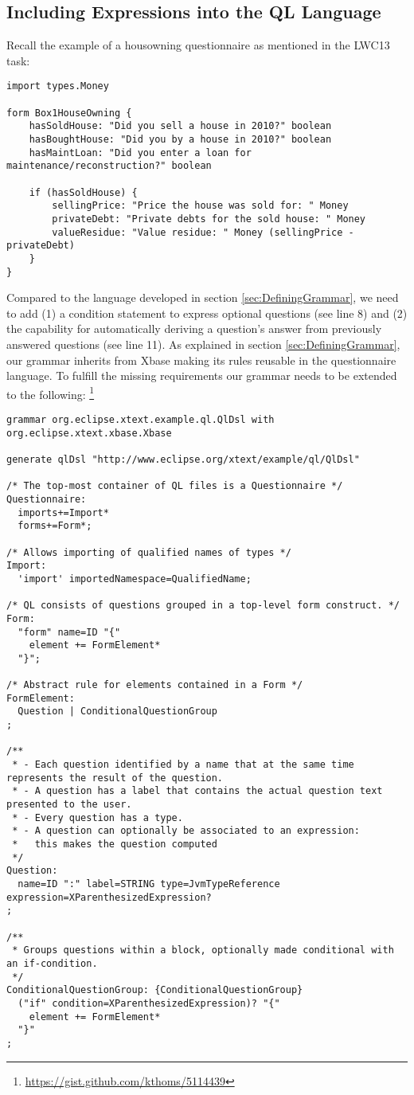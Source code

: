 \subsection{Including Expressions into the QL Language}

Recall the example of a housowning questionnaire as mentioned in the LWC13 task:

\begin{lstlisting}[language=QL]
import types.Money

form Box1HouseOwning {
	hasSoldHouse: "Did you sell a house in 2010?" boolean
	hasBoughtHouse: "Did you by a house in 2010?" boolean
	hasMaintLoan: "Did you enter a loan for maintenance/reconstruction?" boolean
	
	if (hasSoldHouse) {
		sellingPrice: "Price the house was sold for: " Money 
		privateDebt: "Private debts for the sold house: " Money
		valueResidue: "Value residue: " Money (sellingPrice - privateDebt) 
	}
}
\end{lstlisting}

Compared to the language developed in section \ref{sec:DefiningGrammar}, we need to add (1) a condition
statement to express optional questions (see line 8) and (2) the capability for automatically 
deriving a question's answer from previously answered questions (see line 11). As explained in section
\ref{sec:DefiningGrammar}, our grammar inherits from Xbase making its rules reusable in the 
questionnaire language. To fulfill the missing requirements our grammar needs to be extended to the following:
\footnote{\url{https://gist.github.com/kthoms/5114439}}

\begin{lstlisting}[language=Xtext]
grammar org.eclipse.xtext.example.ql.QlDsl with org.eclipse.xtext.xbase.Xbase

generate qlDsl "http://www.eclipse.org/xtext/example/ql/QlDsl"

/* The top-most container of QL files is a Questionnaire */
Questionnaire:
  imports+=Import*
  forms+=Form*;

/* Allows importing of qualified names of types */
Import:
  'import' importedNamespace=QualifiedName;

/* QL consists of questions grouped in a top-level form construct. */
Form:
  "form" name=ID "{"
    element += FormElement*
  "}";

/* Abstract rule for elements contained in a Form */
FormElement:
  Question | ConditionalQuestionGroup
;

/**
 * - Each question identified by a name that at the same time represents the result of the question.
 * - A question has a label that contains the actual question text presented to the user.
 * - Every question has a type.
 * - A question can optionally be associated to an expression:
 *   this makes the question computed
 */
Question:
  name=ID ":" label=STRING type=JvmTypeReference expression=XParenthesizedExpression?
;

/**
 * Groups questions within a block, optionally made conditional with an if-condition.
 */
ConditionalQuestionGroup: {ConditionalQuestionGroup}
  ("if" condition=XParenthesizedExpression)? "{"
    element += FormElement*
  "}"
;
\end{lstlisting}

